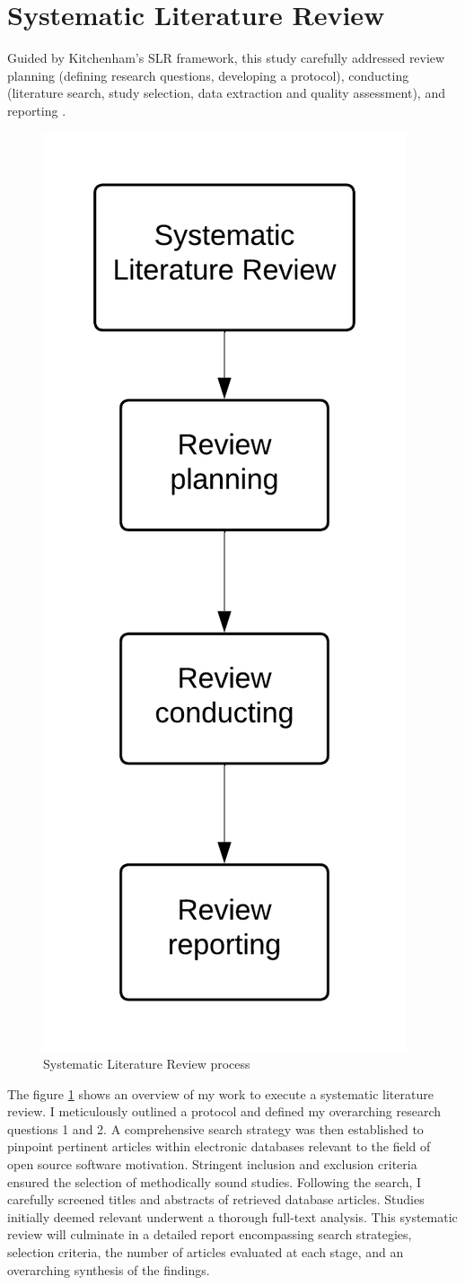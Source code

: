 \section{Systematic Literature Review}

Guided by Kitchenham's SLR framework, this study carefully addressed review planning (defining research questions, developing a protocol), conducting (literature search, study selection, data extraction and quality assessment), and reporting \citep{Kitchenham}.

\begin{figure}[ht]
    \centering
    \includegraphics[width=0.3\linewidth]{figs/slr-overview.png}
    \caption{Systematic Literature Review process \citep{Kitchenham}}
    \label{fig:slr-overview}
\end{figure}

The figure \ref{fig:slr-overview} shows an overview of my work to execute a systematic literature review. I meticulously outlined a protocol and defined my overarching research questions 1 and 2. A comprehensive search strategy was then established to pinpoint pertinent articles within electronic databases relevant to the field of open source software motivation. Stringent inclusion and exclusion criteria ensured the selection of methodically sound studies. Following the search, I carefully screened titles and abstracts of retrieved database articles. Studies initially deemed relevant underwent a thorough full-text analysis. This systematic review will culminate in a detailed report encompassing search strategies, selection criteria, the number of articles evaluated at each stage, and an overarching synthesis of the findings.



